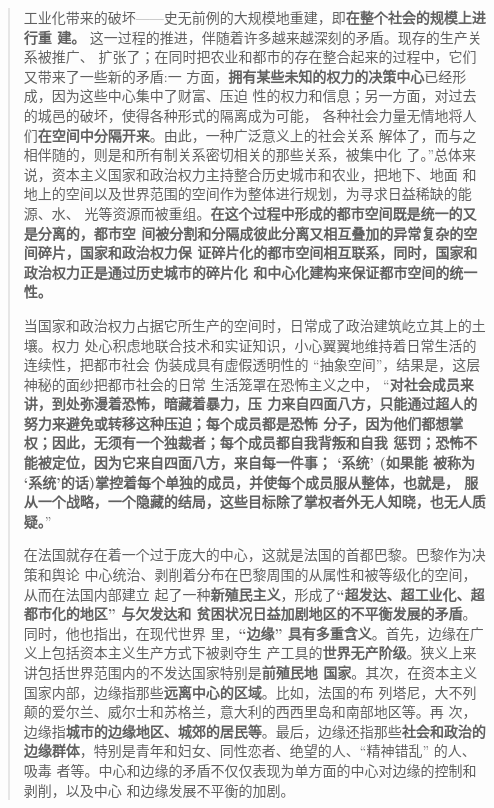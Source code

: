 \begin{quotation}
  工业化带来的破坏——史无前例的大规模地重建，即\textbf{在整个社会的规模上进行重
    建。} 这一过程的推进，伴随着许多越来越深刻的矛盾。现存的生产关系被推广、
  扩张了；在同时把农业和都市的存在整合起来的过程中，它们又带来了一些新的矛盾:一
  方面，\textbf{拥有某些未知的权力的决策中心}已经形成，因为这些中心集中了财富、压迫
  性的权力和信息；另一方面，对过去的城邑的破坏，使得各种形式的隔离成为可能，
  各种社会力量无情地将人们\textbf{在空间中分隔开来}。由此，一种广泛意义上的社会关系
  解体了，而与之相伴随的，则是和所有制关系密切相关的那些关系，被集中化
  了。”总体来说，资本主义国家和政治权力主持整合历史城市和农业，把地下、地面
  和地上的空间以及世界范围的空间作为整体进行规划，为寻求日益稀缺的能源、水、
  光等资源而被重组。\textbf{在这个过程中形成的都市空间既是统一的又是分离的，都市空
    间被分割和分隔成彼此分离又相互叠加的异常复杂的空间碎片，国家和政治权力保
    证碎片化的都市空间相互联系，同时，国家和政治权力正是通过历史城市的碎片化
    和中心化建构来保证都市空间的统一性。}

  当国家和政治权力占据它所生产的空间时，日常成了政治建筑屹立其上的土壤。权力
  处心积虑地联合技术和实证知识，小心翼翼地维持着日常生活的连续性，把都市社会
  伪装成具有虚假透明性的 “抽象空间”，结果是，这层神秘的面纱把都市社会的日常
  生活笼罩在恐怖主义之中， “\textbf{对社会成员来讲，到处弥漫着恐怖，暗藏着暴力，压
    力来自四面八方，只能通过超人的努力来避免或转移这种压迫；每个成员都是恐怖
    分子，因为他们都想掌权；因此，无须有一个独裁者；每个成员都自我背叛和自我
    惩罚；恐怖不能被定位，因为它来自四面八方，来自每一件事； ‘系统’ (如果能
    被称为 ‘系统’的话)掌控着每个单独的成员，并使每个成员服从整体，也就是，
    服从一个战略，一个隐藏的结局，这些目标除了掌权者外无人知晓，也无人质疑。}”

  在法国就存在着一个过于庞大的中心，这就是法国的首都巴黎。巴黎作为决策和舆论
  中心统治、剥削着分布在巴黎周围的从属性和被等级化的空间，从而在法国内部建立
  起了一种\textbf{新殖民主义}，形成了\textbf{“超发达、超工业化、超都市化的地区” 与欠发达和
    贫困状况日益加剧地区的不平衡发展的矛盾}。同时，他也指出，在现代世界
  里，\textbf{“边缘” 具有多重含义}。首先，边缘在广义上包括资本主义生产方式下被剥夺生
  产工具的\textbf{世界无产阶级}。狭义上来讲包括世界范围内的不发达国家特别是\textbf{前殖民地
  国家}。其次，在资本主义国家内部，边缘指那些\textbf{远离中心的区域}。比如，法国的布
  列塔尼，大不列颠的爱尔兰、威尔士和苏格兰，意大利的西西里岛和南部地区等。再
  次，边缘指\textbf{城市的边缘地区、城郊的居民等}。最后，边缘还指那些\textbf{社会和政治的
    边缘群体}，特别是青年和妇女、同性恋者、绝望的人、“精神错乱” 的人、吸毒
  者等。中心和边缘的矛盾不仅仅表现为单方面的中心对边缘的控制和剥削，以及中心
  和边缘发展不平衡的加剧。


\end{quotation}
